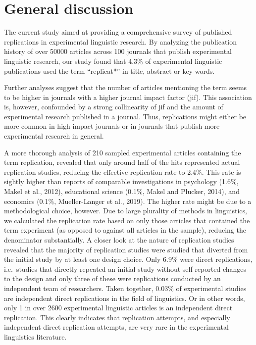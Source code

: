 \documentclass[]{elsarticle} %
\begin{document}
\hypertarget{general-discussion}{%
\section{General discussion}\label{general-discussion}}

The current study aimed at providing a comprehensive survey of published replications in experimental linguistic research.
By analyzing the publication history of over 50000 articles across 100 journals that publish experimental linguistic research, our study found that 4.3\% of experimental linguistic publications used the term ``replicat*'' in title, abstract or key words.

Further analyses suggest that the number of articles mentioning the term seems to be higher in journals with a higher journal impact factor (jif). This association is, however, confounded by a strong collinearity of jif and the amount of experimental research published in a journal. Thus, replications might either be more common in high impact journals or in journals that publish more experimental research in general.

A more thorough analysis of 210 sampled experimental articles containing the term replication, revealed that only around half of the hits represented actual replication studies, reducing the effective replication rate to 2.4\%. This rate is sightly higher than reports of comparable investigations in psychology (1.6\%, Makel et al., 2012), educational science (0.1\%, Makel and Plucker, 2014), and economics (0.1\%, Mueller-Langer et al., 2019). The higher rate might be due to a methodological choice, however. Due to large plurality of methods in linguistics, we calculated the replication rate based on only those articles that contained the term experiment (as opposed to against all articles in the sample), reducing the denominator substantially.
A closer look at the nature of replication studies revealed that the majority of replication studies were studied that diverted from the initial study by at least one design choice. Only 6.9\% were direct replications, i.e.~studies that directly repeated an initial study without self-reported changes to the design and only three of these were replications conducted by an independent team of researchers.
Taken together, 0.03\% of experimental studies are independent direct replications in the field of linguistics. Or in other words, only 1 in over 2600 experimental linguistic articles is an independent direct replication. This clearly indicates that replication attempts, and especially independent direct replication attempts, are very rare in the experimental linguistics literature.
\end{document}
